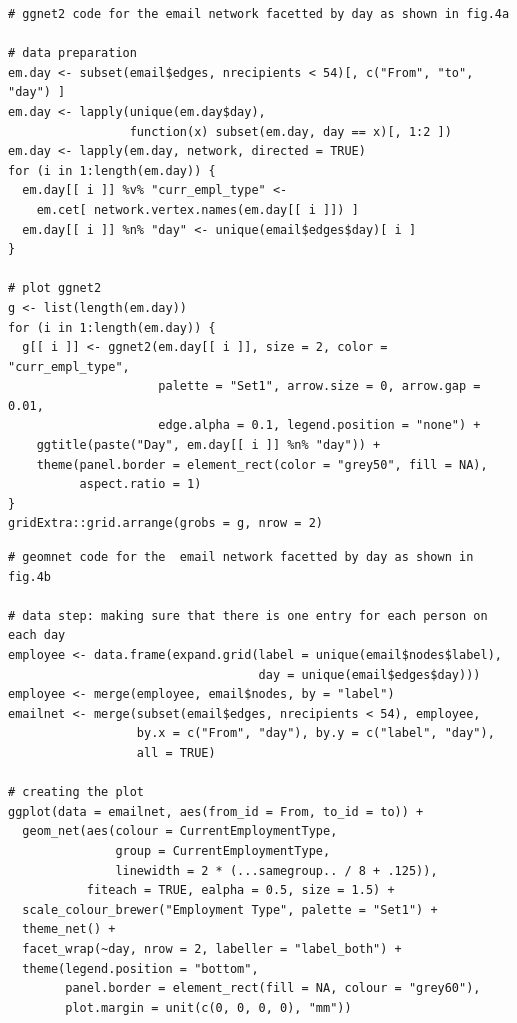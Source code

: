 \afterpage{\clearpage}
\begin{knitrout}
\color{fgcolor}\begin{kframe}
\begin{verbatim}
# ggnet2 code for the email network facetted by day as shown in fig.4a

# data preparation
em.day <- subset(email$edges, nrecipients < 54)[, c("From", "to", "day") ]
em.day <- lapply(unique(em.day$day),
                 function(x) subset(em.day, day == x)[, 1:2 ])
em.day <- lapply(em.day, network, directed = TRUE)
for (i in 1:length(em.day)) {
  em.day[[ i ]] %v% "curr_empl_type" <-
    em.cet[ network.vertex.names(em.day[[ i ]]) ]
  em.day[[ i ]] %n% "day" <- unique(email$edges$day)[ i ]
}

# plot ggnet2
g <- list(length(em.day))
for (i in 1:length(em.day)) {
  g[[ i ]] <- ggnet2(em.day[[ i ]], size = 2, color = "curr_empl_type",
                     palette = "Set1", arrow.size = 0, arrow.gap = 0.01,
                     edge.alpha = 0.1, legend.position = "none") +
    ggtitle(paste("Day", em.day[[ i ]] %n% "day")) +
    theme(panel.border = element_rect(color = "grey50", fill = NA),
          aspect.ratio = 1)
}
gridExtra::grid.arrange(grobs = g, nrow = 2)
\end{verbatim}
\end{kframe}
\end{knitrout}

\begin{knitrout}
\color{fgcolor}\begin{kframe}
\begin{verbatim}
# geomnet code for the  email network facetted by day as shown in fig.4b

# data step: making sure that there is one entry for each person on each day
employee <- data.frame(expand.grid(label = unique(email$nodes$label),
                                   day = unique(email$edges$day)))
employee <- merge(employee, email$nodes, by = "label")
emailnet <- merge(subset(email$edges, nrecipients < 54), employee,
                  by.x = c("From", "day"), by.y = c("label", "day"),
                  all = TRUE)

# creating the plot
ggplot(data = emailnet, aes(from_id = From, to_id = to)) +
  geom_net(aes(colour = CurrentEmploymentType,
               group = CurrentEmploymentType,
               linewidth = 2 * (...samegroup.. / 8 + .125)),
           fiteach = TRUE, ealpha = 0.5, size = 1.5) +
  scale_colour_brewer("Employment Type", palette = "Set1") +
  theme_net() +
  facet_wrap(~day, nrow = 2, labeller = "label_both") +
  theme(legend.position = "bottom",
        panel.border = element_rect(fill = NA, colour = "grey60"),
        plot.margin = unit(c(0, 0, 0, 0), "mm"))
\end{verbatim}
\end{kframe}
\end{knitrout}

